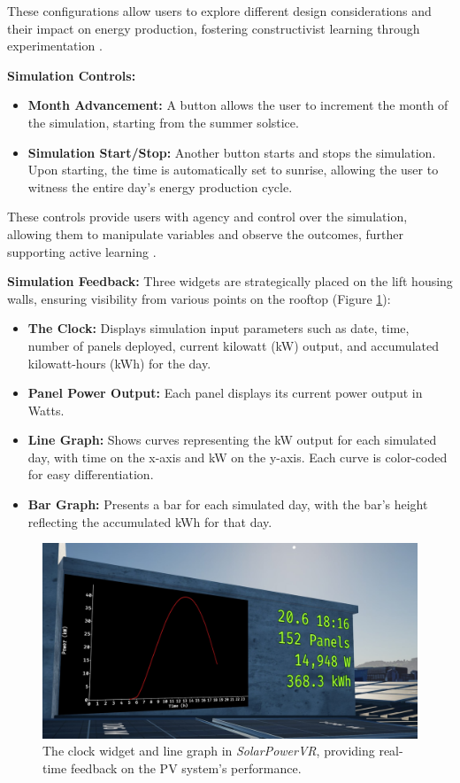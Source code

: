 \documentclass[draft, final]{vutinfth} %
\begin{document}
These configurations allow users to explore different design considerations and their impact on energy production, fostering constructivist learning through experimentation \cite{Mikropoulos2011VrEducational}.

\textbf{Simulation Controls:}

\begin{itemize}
    \item \textbf{Month Advancement:} A button allows the user to increment the month of the simulation, starting from the summer solstice.
    \item \textbf{Simulation Start/Stop:} Another button starts and stops the simulation. Upon starting, the time is automatically set to sunrise, allowing the user to witness the entire day's energy production cycle.
\end{itemize}

These controls provide users with agency and control over the simulation, allowing them to manipulate variables and observe the outcomes, further supporting active learning \cite{Dalgarno2010Learning}.

\textbf{Simulation Feedback:} Three widgets are strategically placed on the lift housing walls, ensuring visibility from various points on the rooftop  (Figure \ref{fig:simulation-feedback}):

\begin{itemize}
    \item \textbf{The Clock:} Displays simulation input parameters such as date, time, number of panels deployed, current kilowatt (kW) output, and accumulated kilowatt-hours (kWh) for the day.
    \item \textbf{Panel Power Output:} Each panel displays its current power output in Watts.
    \item \textbf{Line Graph:} Shows curves representing the kW output for each simulated day, with time on the x-axis and kW on the y-axis. Each curve is color-coded for easy differentiation.
    \item \textbf{Bar Graph:} Presents a bar for each simulated day, with the bar's height reflecting the accumulated kWh for that day.
\end{itemize}

\begin{figure}
    \centering
    \includegraphics[width=\textwidth]{graphics/clock-power.jpg}
    \caption{The clock widget and line graph in \textit{SolarPowerVR}, providing real-time feedback on the PV system's performance.}
    \label{fig:simulation-feedback}
\end{figure}
\end{document}
